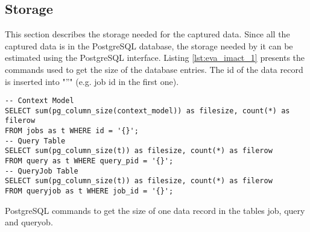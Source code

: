 \documentclass[draft,final]{vutinfth} %
\begin{document}

\subsection*{Storage}\label{Evaluation:impact_stor}
This section describes the storage needed for the captured data. Since all the captured data is in the PostgreSQL database, the storage needed by it can be estimated using the PostgreSQL interface. Listing \ref{lst:eva_imact_1} presents the commands used to get the size of the database entries. The id of the data record is inserted into "''" (e.g. job id in the first one).  

\begin{listing}[ht]
	\begin{verbatim}
-- Context Model 
SELECT sum(pg_column_size(context_model)) as filesize, count(*) as filerow 
FROM jobs as t WHERE id = '{}';
-- Query Table
SELECT sum(pg_column_size(t)) as filesize, count(*) as filerow 
FROM query as t WHERE query_pid = '{}';
-- QueryJob Table
SELECT sum(pg_column_size(t)) as filesize, count(*) as filerow 
FROM queryjob as t WHERE job_id = '{}';
	\end{verbatim}
	\caption{PostgreSQL commands to get the size of one data record in the tables job, query and queryob.}
	\label{lst:eva_imact_1}
\end{listing}	

\end{document}
